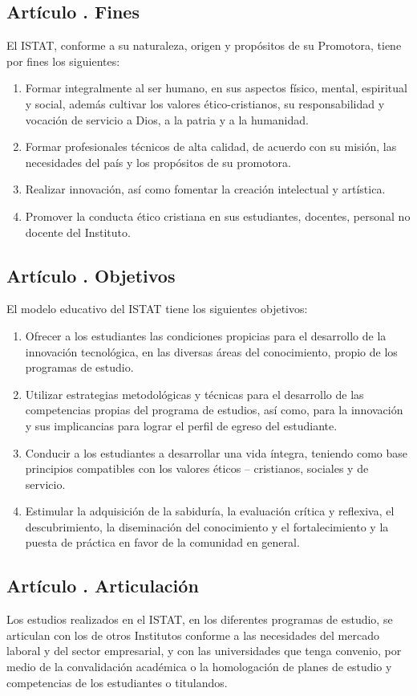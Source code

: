 \subsection{Artículo . Fines}
\addtocounter{ns}{1}

El ISTAT, conforme a su naturaleza, origen y propósitos de su Promotora, tiene por fines los siguientes:
\begin{enumerate}
\item Formar integralmente al ser humano, en sus aspectos físico, mental, espiritual y social, además cultivar los valores ético-cristianos, su responsabilidad y vocación de servicio a Dios, a la patria y a la humanidad.  
\item Formar profesionales técnicos de alta calidad, de acuerdo con su misión, las necesidades del país y los propósitos de su promotora.  
\item Realizar innovación, así como fomentar la creación intelectual y artística.  
\item Promover la conducta ético cristiana en sus estudiantes, docentes, personal no docente del Instituto. 
\end{enumerate}
\subsection{Artículo . Objetivos}
\addtocounter{ns}{1}
El modelo educativo del ISTAT tiene los siguientes objetivos:
\begin{enumerate}
\item Ofrecer a los estudiantes las condiciones propicias para el desarrollo de la innovación tecnológica, en las diversas áreas del conocimiento, propio de los programas de estudio.   
\item Utilizar estrategias metodológicas y técnicas para el desarrollo de las competencias propias del programa de estudios, así como, para la innovación y sus implicancias para lograr el perfil de egreso del estudiante.  
\item Conducir a los estudiantes a desarrollar una vida íntegra, teniendo como base principios compatibles con los valores éticos – cristianos, sociales y de servicio.  
\item Estimular la adquisición de la sabiduría, la evaluación crítica y reflexiva, el descubrimiento, la diseminación del conocimiento y el fortalecimiento y la puesta de práctica en favor de la comunidad en general.
\end{enumerate}
\subsection{Artículo . Articulación}
\addtocounter{ns}{1}
Los estudios realizados en el ISTAT, en los diferentes programas de estudio, se articulan con los de otros Institutos conforme a las necesidades del mercado laboral y del sector empresarial, y con las universidades que tenga convenio, por medio de la convalidación académica o la homologación de planes de estudio y competencias de los estudiantes o titulandos.
